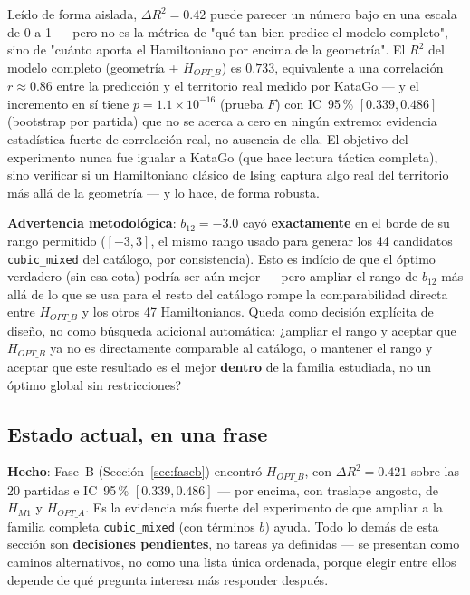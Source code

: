 \documentclass[11pt, a4paper]{article}
\newcommand{\good}[1]{\color{cGood}\textbf{#1}}
\begin{document}
\begin{tcolorbox}[quotebox]
  Le\'ido de forma aislada, $\Delta R^2=0.42$ puede parecer un n\'umero
  bajo en una escala de 0 a 1 --- pero no es la m\'etrica de "qu\'e tan
  bien predice el modelo completo", sino de "cu\'anto aporta el
  Hamiltoniano por encima de la geometr\'ia". El $R^2$ del modelo
  completo (geometr\'ia + $H_{OPT\_B}$) es $0.733$, equivalente a una
  correlaci\'on $r\approx0.86$ entre la predicci\'on y el territorio
  real medido por KataGo --- y el incremento en s\'i tiene
  $p=1.1\times10^{-16}$ (prueba $F$) con IC~95\,\% $[0.339,0.486]$
  (bootstrap por partida) que no se acerca a cero en ning\'un extremo:
  evidencia estad\'istica fuerte de correlaci\'on real, no ausencia de
  ella. El objetivo del experimento nunca fue igualar a KataGo (que
  hace lectura t\'actica completa), sino verificar si un Hamiltoniano
  cl\'asico de Ising captura algo real del territorio m\'as all\'a de
  la geometr\'ia --- y lo hace, de forma robusta.
\end{tcolorbox}

\begin{tcolorbox}[pendingbox]
  \textbf{Advertencia metodol\'ogica}: $b_{12}=-3.0$ cay\'o
  \textbf{exactamente} en el borde de su rango permitido ($[-3,3]$,
  el mismo rango usado para generar los 44 candidatos
  \texttt{cubic\_mixed} del cat\'alogo, por consistencia). Esto es
  ind\'icio de que el \'optimo verdadero (sin esa cota) podr\'ia ser
  a\'un mejor --- pero ampliar el rango de $b_{12}$ m\'as all\'a de lo
  que se usa para el resto del cat\'alogo rompe la comparabilidad
  directa entre $H_{OPT\_B}$ y los otros 47 Hamiltonianos. Queda como
  decisi\'on expl\'icita de dise\~no, no como b\'usqueda adicional
  autom\'atica: ¿ampliar el rango y aceptar que $H_{OPT\_B}$ ya no es
  directamente comparable al cat\'alogo, o mantener el rango y aceptar
  que este resultado es el mejor \textbf{dentro} de la familia
  estudiada, no un \'optimo global sin restricciones?
\end{tcolorbox}

\subsection{Estado actual, en una frase}

\good{Hecho}: Fase~B (Secci\'on~\ref{sec:faseb}) encontr\'o $H_{OPT\_B}$,
con $\Delta R^2=0.421$ sobre las 20 partidas e IC~95\,\%
$[0.339,0.486]$ --- por encima, con traslape angosto, de $H_{M1}$ y
$H_{OPT\_A}$. Es la evidencia m\'as fuerte del experimento de que
ampliar a la familia completa \texttt{cubic\_mixed} (con t\'erminos
$b$) ayuda. Todo lo dem\'as de esta secci\'on son \textbf{decisiones
pendientes}, no tareas ya definidas --- se presentan como caminos
alternativos, no como una lista \'unica ordenada, porque elegir entre
ellos depende de qu\'e pregunta interesa m\'as responder despu\'es.
\end{document}
